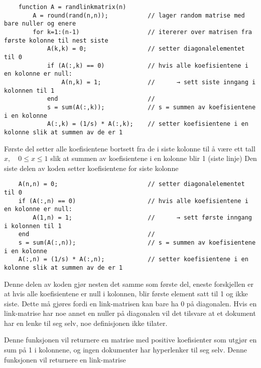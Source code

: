 \documentclass{article}%
\begin{document}
\begin{tcolorbox}[colframe=white]
    \scriptsize
    \begin{verbatim}
    function A = randlinkmatrix(n)
        A = round(rand(n,n));           // lager random matrise med bare nuller og enere
        for k=1:(n-1)                   // itererer over matrisen fra første kolonne til nest siste
            A(k,k) = 0;                 // setter diagonalelementet til 0
            if (A(:,k) == 0)            // hvis alle koefisientene i en kolonne er null:
                A(n,k) = 1;             //      → sett siste inngang i kolonnen til 1
            end                         //
            s = sum(A(:,k));            // s = summen av koefisientene i en kolonne
            A(:,k) = (1/s) * A(:,k);    // setter koefisientene i en kolonne slik at summen av de er 1    
\end{verbatim}
\end{tcolorbox}
Første del setter alle koefisientene bortsett fra de i siste kolonne til å være ett tall $x, \quad 0\leq x \leq 1$
slik at summen av koefisientene i en kolonne blir 1 (siste linje)
\newpage
Den siste delen av koden setter koefisientene for siste kolonne
\begin{tcolorbox}[colframe=white]
    \scriptsize
    \begin{verbatim}
    A(n,n) = 0;                         // setter diagonalelementet til 0
    if (A(:,n) == 0)                    // hvis alle koefisientene i en kolonne er null:
        A(1,n) = 1;                     //      → sett første inngang i kolonnen til 1
    end                                 //
    s = sum(A(:,n));                    // s = summen av koefisientene i en kolonne
    A(:,n) = (1/s) * A(:,n);            // setter koefisientene i en kolonne slik at summen av de er 1 
    \end{verbatim}
\end{tcolorbox}
Denne delen av koden gjør nesten det samme som første del, eneste forskjellen er at hvis alle koefisientene
er null i kolonnen, blir første element satt til 1 og ikke siste. Dette må gjøres fordi en link-matrisen
kan bare ha 0 på diagonalen. Hvis en link-matrise har noe annet en nuller på diagonalen vil det tilsvare at
et dokument har en lenke til seg selv, noe definisjonen ikke tilater.
\begin{tcolorbox}[halign title=center, box align=top] 
    Denne funksjonen vil returnere en matrise med positive koefisienter som utgjør en sum på 1 i kolonnene, og ingen dokumenter har hyperlenker
    til seg selv. Denne funksjonen vil returnere en link-matrise
\end{tcolorbox}
\end{document}
